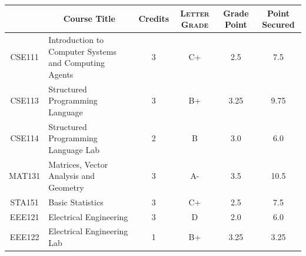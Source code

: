 \documentclass[11pt]{article}
\newcommand*{\numtwo}[1]{\pgfmathprintnumber[
                    fixed, precision=2, fixed zerofill=true]{#1}}
\begin{document}
                \begin{center}
                    \renewcommand{\arraystretch}{1.08}
                    
                \begin{tabular}{|c|l|c|>{\scshape}c|c|c|}
                \hline  \rule[-1ex]{0pt}{3.5ex} {\centering{\bf Course Code}} &  \multicolumn{1}{c|}{\textbf{Course Title}}  & {\bf Credits} & {\bf Letter Grade} & {\bf Grade Point} & {\bf Point Secured}  \\ 
                \hline   CSE111 &  Introduction to Computer Systems and Computing Agents		 & 3 & C+ & 2.5 & 7.5 \\ %
                \hline   CSE113 &  Structured Programming Language		 & 3 & B+ & 3.25 & 9.75 \\ %
                \hline   CSE114 &  Structured Programming Language Lab		 & 2 & B & 3.0 & 6.0 \\ %
                \hline   MAT131 &  Matrices, Vector Analysis and Geometry		 & 3 & A- & 3.5 & 10.5 \\ %
                \hline   STA151 &  Basic Statistics		 & 3 & C+ & 2.5 & 7.5 \\ %
                \hline   EEE121 &  Electrical Engineering		 & 3 & D & 2.0 & 6.0 \\ %
                \hline   EEE122 &  Electrical Engineering Lab		 & 1 & B+ & 3.25 & 3.25 \\ %

\hline                %
                \end{tabular}
                \end{center}
                \renewcommand{\arraystretch}{1.03}
\end{document}
